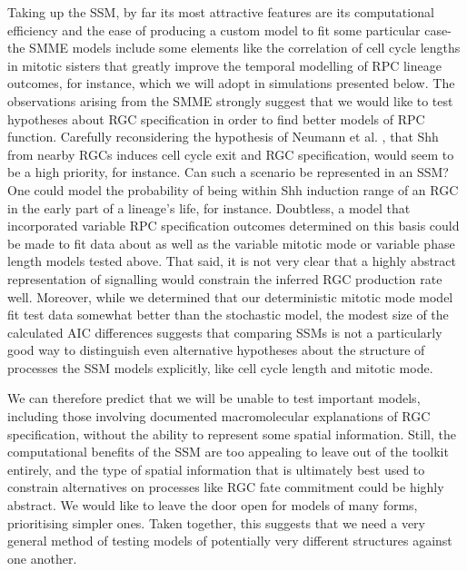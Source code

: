 Taking up the SSM, by far its most attractive features are its computational efficiency and the ease of producing a custom model to fit some particular case-  the SMME models include some elements like the correlation of cell cycle lengths in mitotic sisters that greatly improve the temporal modelling of RPC lineage outcomes, for instance, which we will adopt in simulations presented below. The observations arising from the SMME strongly suggest that we would like to test hypotheses about RGC specification in order to find better models of RPC function. Carefully reconsidering the hypothesis of Neumann et al. \cite{Neumann2000}, that Shh from nearby RGCs induces cell cycle exit and RGC specification, would seem to be a high priority, for instance. Can such a scenario be represented in an SSM? One could model the probability of being within Shh induction range of an RGC in the early part of a lineage's life, for instance. Doubtless, a model that incorporated variable RPC specification outcomes determined on this basis could be made to fit data about as well as the variable mitotic mode or variable phase length models tested above. That said, it is not very clear that a highly abstract representation of signalling would constrain the inferred RGC production rate well. Moreover, while we determined that our deterministic mitotic mode model fit test data somewhat better than the stochastic model, the modest size of the calculated AIC differences suggests that comparing SSMs is not a particularly good way to distinguish even alternative hypotheses about the structure of processes the SSM models explicitly, like cell cycle length and mitotic mode. 

We can therefore predict that we will be unable to test important models, including those involving documented macromolecular explanations of RGC specification, without the ability to represent some spatial information. Still, the computational benefits of the SSM are too appealing to leave out of the toolkit entirely, and the type of spatial information that is ultimately best used to constrain alternatives on processes like RGC fate commitment could be highly abstract. We would like to leave the door open for models of many forms, prioritising simpler ones. Taken together, this suggests that we need a very general method of testing models of potentially very different structures against one another.

